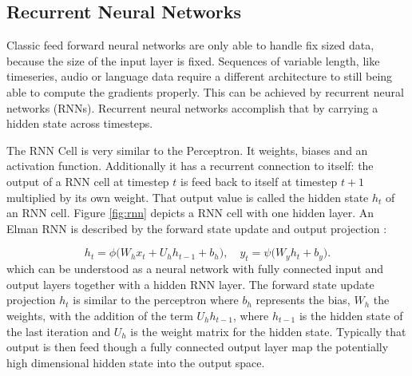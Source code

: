 \documentclass[twoside,a4paper,10pt,DIV=12,BCOR=12mm]{scrartcl}
\begin{document}
\subsection{Recurrent Neural Networks}

Classic feed forward neural networks are only able to handle fix sized data, because the size of the input layer
is fixed. Sequences of variable length, like timeseries, audio or language data require a different
architecture to still being able to compute the gradients properly. This can be achieved by recurrent
neural networks (RNNs). Recurrent neural networks accomplish that by carrying a hidden state across timesteps.

\begin{center}
  \label{fig:rnn}
\end{center}

The RNN Cell is very similar to the Perceptron. It weights, biases and an activation function. Additionally 
it has a recurrent connection to itself: the output of a RNN cell at timestep $t$ is feed back to itself at timestep
$t+1$ multiplied by its own weight. That output value is called the hidden state $h_t$ of an RNN cell.
Figure \ref{fig:rnn} depicts a RNN cell with one hidden layer.
An Elman RNN is described by the forward state update and output projection \cite{Elman90}:

$$
h_t = \phi\!\bigl(W_h x_t + U_h h_{t-1} + b_h\bigr), \quad
y_t = \psi\!\bigl(W_y h_t + b_y\bigr).
$$
which can be understood as a neural network with fully connected input and output layers together with a hidden RNN layer.
The forward state update projection $h_t$ is similar to the perceptron where $b_h$ represents the bias, $W_h$ the weights,
with the addition of the term $U_hh_{t-1}$, where $h_{t-1}$ is the hidden state of the last iteration and $U_h$ is the weight
matrix for the hidden state. Typically that output is then feed though a fully connected output layer map the
potentially high dimensional hidden state into the output space.\\
\end{document}
